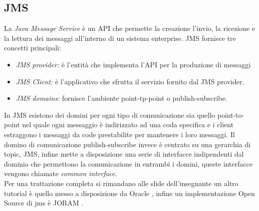 \subsection{JMS}
La \emph{Java Message Service} è un API che permette la creazione l'invio, la ricezione  e la lettura dei messaggi all'interno di un sistema enterprise. JMS fornisce tre concetti principali:
\begin{itemize}
	\item \emph{JMS provider:} è l'entità che implementa l'API per la produzione di messaggi
	\item \emph{JMS Client:} è l'applicativo che sfrutta il servizio fornito dal JMS provider.
	\item \emph{JMS domains:} fornisce l'ambiente point-tp-point o publish-subscribe.
\end{itemize}
In JMS esistono dei domini per ogni tipo di comunicazione sia quello point-to-point nel quale ogni messaggio è indirizzato ad una coda specifica e i client estraggono i messaggi da code prestabilite per mantenere i loro messaggi. Il domino di comunicazione publish-subscribe invece è centrato su una gerarchia di topic, JMS, infine mette a disposizione una serie di interfacce indipendenti dal dominio che permettono la comunicazione in entrambi i domini, queste interfacce vengono chiamate \emph{common interface}.\\
Per una trattazione completa si rimandano alle slide dell'insegnante \cite{cugola:jms} un altro tutorial è quello messo a disposizione da Oracle \cite{sun:jms}, infine un implementazione Open Source di jms è JORAM \cite{joram:jms}.
